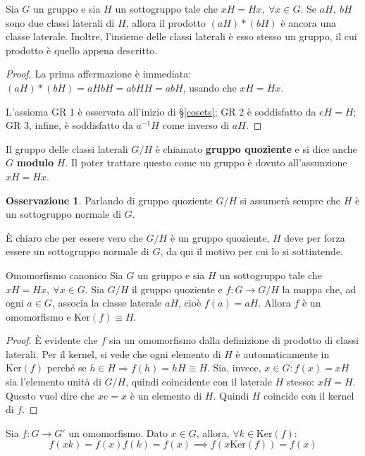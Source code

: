 \documentclass[11pt, a4paper]{scrartcl}
\theoremstyle{definition}
\numberwithin{esempio}{section}
\theoremstyle{definition}
\newtheorem{obs}{Osservazione}
\numberwithin{obs}{section}
\numberwithin{nota}{section}
\numberwithin{equation}{subsection}
\begin{document}
\begin{teorema}
	{}{}
	Sia $G$ un gruppo e sia $H$ un sottogruppo tale che $xH = Hx, \ \forall x \in G$. Se $aH, \ bH$ sono due classi laterali di $H$, allora il prodotto $(aH) * (bH) $ \`e ancora una classe laterale. Inoltre, l'insieme delle classi laterali \`e esso stesso un gruppo, il cui prodotto \`e quello appena descritto.

	\begin{proof}
		La prima affermazione \`e immediata: $(aH) * (bH) = aHbH = abHH = abH$, usando che $xH = Hx$.

		L'assioma GR 1 \`e osservata all'inizio di \S \ref{cosets}; GR 2 \`e soddisfatto da $eH = H$; GR 3, infine, \`e soddisfatto da $a^{-1 } H$ come inverso di $aH$.
	\end{proof}
\end{teorema}
\noindent Il gruppo delle classi laterali $G / H$ \`e chiamato \textbf{gruppo quoziente} e si dice anche $G$ \textbf{modulo} $H$. 
Il poter trattare questo come un gruppo \`e dovuto all'assunzione $xH = Hx$.
\begin{obs}
	Parlando di gruppo quoziente $G / H$ si assumer\`a sempre che $H$ \`e un sottogruppo normale di $G$.

	\`E chiaro che per essere vero che $G / H$ \`e un gruppo quoziente, $H$ deve per forza essere un sottogruppo normale di $G$, da qui il motivo per cui lo si sottintende.
\end{obs}
\begin{corollario}
	{Omomorfismo canonico}{}
	Sia $G$ un gruppo e sia $H$ un sottogruppo tale che $xH = Hx , \ \forall x \in G$. Sia $G / H$ il gruppo quoziente e $f:G\to G /H$ la mappa che, ad ogni $a\in G$, associa la classe laterale $aH$, cio\`e $f(a) = aH$. Allora $f$ \`e un omomorfismo e $\mathrm{Ker} (f) \equiv H$.
	\begin{proof}
	\`E evidente che $f$ sia un omomorfismo dalla definizione di prodotto di classi laterali.
	Per il kernel, si vede che ogni elemento di $H$ \`e automaticamente in $\mathrm{Ker} (f)$ perch\'e se $h \in H \Rightarrow  f(h) = hH \equiv H$.
Sia, invece, $x \in G:f(x) = xH $ sia l'elemento unit\`a di $G/H$, quindi coincidente con il laterale $H$ stesso: $xH = H$.
Questo vuol dire che $xe = x$ \`e un elemento di $H$. Quindi $H$ coincide con il kernel di $f$.
	\end{proof}
\end{corollario}
Sia $f:G\to G'$ un omomorfismo. Dato $x \in G$, allora, $\forall k \in \mathrm{Ker} (f)$:
\[
	f(xk) = f(x) f(k) = f(x) \implies f(x\mathrm{Ker} (f)) = f(x)
\] 
\end{document}
